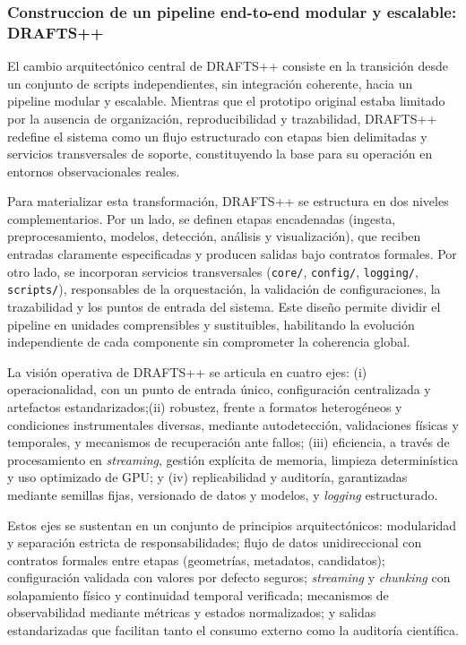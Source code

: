 \subsubsection{Construccion de un pipeline end-to-end modular y escalable: DRAFTS++}


El cambio arquitectónico central de DRAFTS++ consiste en la transición desde un conjunto de scripts independientes, sin integración coherente, hacia un pipeline modular y escalable. Mientras que el prototipo original estaba limitado por la ausencia de organización, reproducibilidad y trazabilidad, DRAFTS++ redefine el sistema como un flujo estructurado con etapas bien delimitadas y servicios transversales de soporte, constituyendo la base para su operación en entornos observacionales reales.

Para materializar esta transformación, DRAFTS++ se estructura en dos niveles complementarios. Por un lado, se definen etapas encadenadas (ingesta, preprocesamiento, modelos, detección, análisis y visualización), que reciben entradas claramente especificadas y producen salidas bajo contratos formales. Por otro lado, se incorporan servicios transversales (\texttt{core/}, \texttt{config/}, \texttt{logging/}, \texttt{scripts/}), responsables de la orquestación, la validación de configuraciones, la trazabilidad y los puntos de entrada del sistema. Este diseño permite dividir el pipeline en unidades comprensibles y sustituibles, habilitando la evolución independiente de cada componente sin comprometer la coherencia global.


La visión operativa de DRAFTS++ se articula en cuatro ejes: (i) operacionalidad, con un punto de entrada único, configuración centralizada y artefactos estandarizados;(ii) robustez, frente a formatos heterogéneos y condiciones instrumentales diversas, mediante autodetección, validaciones físicas y temporales, y mecanismos de recuperación ante fallos; (iii) eficiencia, a través de procesamiento en \textit{streaming}, gestión explícita de memoria, limpieza determinística y uso optimizado de GPU; y (iv) replicabilidad y auditoría, garantizadas mediante semillas fijas, versionado de datos y modelos, y \textit{logging} estructurado.

Estos ejes se sustentan en un conjunto de principios arquitectónicos: modularidad y separación estricta de responsabilidades; flujo de datos unidireccional con contratos formales entre etapas (geometrías, metadatos, candidatos); configuración validada con valores por defecto seguros; \textit{streaming} y \textit{chunking} con solapamiento físico y continuidad temporal verificada; mecanismos de observabilidad mediante métricas y estados normalizados; y salidas estandarizadas que facilitan tanto el consumo externo como la auditoría científica.


